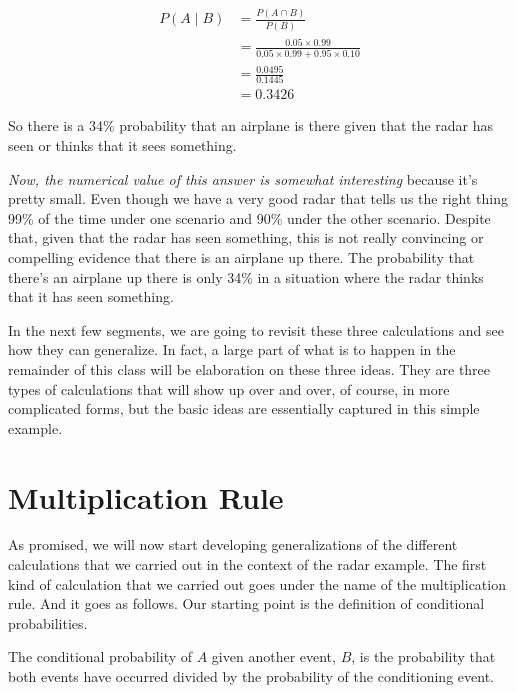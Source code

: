 \documentclass{tufte-handout}
\begin{document}
\begin{align*}
P(A \mid B) &= \frac{P(A \cap B)} {P(B) }\\
                   & = \frac{0.05 \times 0.99} {0.05 \times 0.99 + 0.95 \times 0.10}\\
                   & = \frac{0.0495}{0.1445}\\
                   & = 0.3426
\end{align*}

\vspace{0.2cm}
So there is a 34\% probability that an airplane
is there given that the radar has seen or thinks that it sees something.

\vspace{0.2cm}
\textit{Now, the numerical value of this answer is somewhat interesting}  because it's pretty small. Even though we
have a very good radar that tells us the right thing 99\% of the time under one scenario and 90\% under
the other scenario. Despite that, given that the radar has seen something, this is not really convincing
or compelling evidence that there is an airplane up there. The probability that there's an airplane up
there is only 34\% in a situation where the radar thinks that it has seen something.

\vspace{0.2cm}
In the next few segments, we are going to revisit these three calculations and see how they can
generalize. In fact, a large part of what is to happen in the remainder of this class will be elaboration on
these three ideas. They are three types of calculations that will show up over and over, of course, in
more complicated forms, but the basic ideas are essentially captured in this simple example. 

\pagebreak
\section{Multiplication Rule}\label{sec:MultRule}

As promised, we will now start developing generalizations of the different calculations that we carried
out in the context of the radar example. The first kind of calculation that we carried out goes under the
name of the multiplication rule. And it goes as follows. Our starting point is the definition of conditional
probabilities.

The conditional probability of $A$ given another event, $B$, is the probability that both events have occurred
divided by the probability of the conditioning event. 
\end{document}
